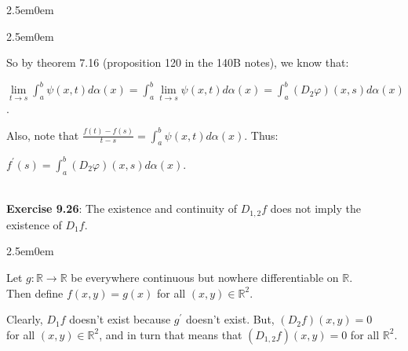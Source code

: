 \documentclass{book}
\newcommand{\exOne}{%
   \color{Purple}%
   \fontsize{14}{16}\selectfont%
}
\newcommand{\exTwo}{%
   \color{RedViolet}%
   \fontsize{13}{15}\selectfont%
}
\newenvironment{myIndent}{%
   \begin{adjustwidth}{2.5em}{0em}%
}{%
   \end{adjustwidth}%
}
\newcommand{\mySepTwo}[1][.]{%
   {\noindent\color{#1}{\rule{6.5in}{0.5mm}}}\\%
}
\newcommand{\retTwo}{\hfill\bigbreak}
\begin{document}
{\begin{myIndent}
{\begin{myIndent}
      So by theorem 7.16 (proposition 120 in the 140B notes), we know that:
      
      {\center $\lim\limits_{t\rightarrow s}\int_a^b\psi(x, t)d\alpha(x)  = \int_a^b \lim\limits_{t\rightarrow s}\psi(x, t)d\alpha(x) = \int_a^b (D_2\varphi)(x, s)d\alpha(x)$.\retTwo\par}

      Also, note that $\frac{f(t) - f(s)}{t - s} = \int_a^b \psi(x, t) d\alpha(x)$. Thus:
      
      {\center$f^\prime(s) = \int_a^b (D_2\varphi)(x, s)d\alpha(x)$.\retTwo\par}
   \end{myIndent}}
\end{myIndent}}

\exOne
\mySepTwo

\textbf{Exercise 9.26}: The existence and continuity of $D_{1,2}f$ does not imply the\\ existence of $D_1f$.

{\begin{myIndent}\exTwo
   Let $g: \mathbb{R} \longrightarrow \mathbb{R}$ be everywhere continuous but nowhere differentiable on $\mathbb{R}$.\\ Then define $f(x, y) = g(x)$ for all $(x, y) \in \mathbb{R}^2$.\retTwo

   Clearly, $D_1f$ doesn't exist because $g^\prime$ doesn't exist. But, $(D_2f)(x, y) = 0$\\ for all $(x, y) \in \mathbb{R}^2$, and in turn that means that $(D_{1,2}f)(x,y) = 0$ for all $\mathbb{R}^2$.\retTwo
\end{myIndent}}

\mySepTwo

\newpage
\end{document}
